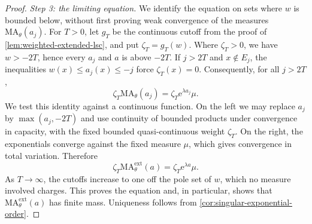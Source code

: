 \begin{proof}
\emph{Step 3: the limiting equation.} We identify the equation on sets where $w$ is bounded below, without first proving weak convergence of the measures $\mathrm{MA}_\theta(a_j)$. For $T>0$, let $g_T$ be the continuous cutoff from the proof of \cref{lem:weighted-extended-lsc}, and put $\zeta_T=g_T(w)$. Where $\zeta_T>0$, we have $w>-2T$, hence every $a_j$ and $a$ is above $-2T$. If $j>2T$ and $x\notin E_j$, the inequalities $w(x)\leq a_j(x)\leq-j$ force $\zeta_T(x)=0$. Consequently, for all $j>2T$,
\[
 \zeta_T\mathrm{MA}_\theta(a_j)
       =\zeta_T \mathrm{e}^{\lambda a_j}\mu.
\]
We test this identity against a continuous function. On the left we may replace $a_j$ by $\max(a_j,-2T)$ and use continuity of bounded products under convergence in capacity, with the fixed bounded quasi-continuous weight $\zeta_T$. On the right, the exponentials converge against the fixed measure $\mu$, which gives convergence in total variation. Therefore
\[
 \zeta_T\mathrm{MA}^{\mathrm{ext}}_\theta(a)
       =\zeta_T\mathrm{e}^{\lambda a}\mu.
\]
As $T\to\infty$, the cutoffs increase to one off the pole set of $w$, which no measure involved charges. This proves the equation and, in particular, shows that $\mathrm{MA}^{\mathrm{ext}}_\theta(a)$ has finite mass. Uniqueness follows from \cref{cor:singular-exponential-order}.
\end{proof}
